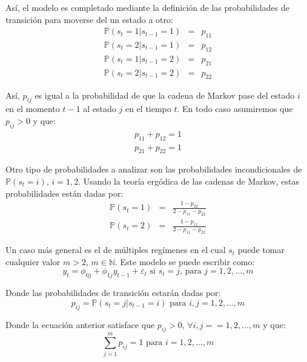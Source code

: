 \documentclass[
]{book}
\begin{document}
Así, el modelo es completado mediante la definición de las probabilidades de transición para moverse del un estado a otro:
\begin{eqnarray*}
    \mathbb{P}(s_t = 1 | s_{t-1} = 1) & = & p_{11} \\
    \mathbb{P}(s_t = 2 | s_{t-1} = 1) & = & p_{12} \\
    \mathbb{P}(s_t = 1 | s_{t-1} = 2) & = & p_{21} \\
    \mathbb{P}(s_t = 2 | s_{t-1} = 2) & = & p_{22} 
\end{eqnarray*}

Así, \(p_{ij}\) es igual a la probabilidad de que la cadena de Markov pase del estado \(i\) en el momento \(t-1\) al estado \(j\) en el tiempo \(t\). En todo caso asumiremos que \(p_{ij} > 0\) y que:
\begin{eqnarray*}
    p_{11} + p_{12} = 1 \\
    p_{21} + p_{22} = 1 
\end{eqnarray*}

Otro tipo de probabilidades a analizar son las probabilidades incondicionales de \(\mathbb{P}(s_t = i)\), \(i = 1, 2\). Usando la teoría ergódica de las cadenas de Markov, estas probabilidades están dadas por:
\begin{eqnarray*}
    \mathbb{P}(s_t = 1) & = & \frac{1 - p_{22}}{2 - p_{11} - p_{22}} \\ 
    \mathbb{P}(s_t = 2) & = & \frac{1 - p_{11}}{2 - p_{11} - p_{22}}
\end{eqnarray*}

Un caso más general es el de múltiples regímenes en el cual \(s_t\) puede tomar cualquier valor \(m > 2\), \(m \in \mathbb{N}\). Este modelo se puede escribir como:
\begin{equation}
    y_t = \phi_{0j} + \phi_{1j} y_{t-1} + \varepsilon_t \text{ si } s_t = j \text{, para } j = 1, 2, \ldots, m
\end{equation}

Donde las probabilidades de transición estarán dadas por:
\begin{equation}
    p_{ij} = \mathbb{P}(s_t = j | s_{t-1} = i) \text{ para } i , j = 1, 2, \ldots, m
\end{equation}

Donde la ecuación anterior satisface que \(p_{ij} > 0\), \(\forall i, j = = 1, 2, \ldots, m\) y que:
\begin{equation*}
    \sum_{j=1}^m p_{ij} = 1 \text{ para } i = 1, 2, \ldots, m
\end{equation*}
\end{document}
